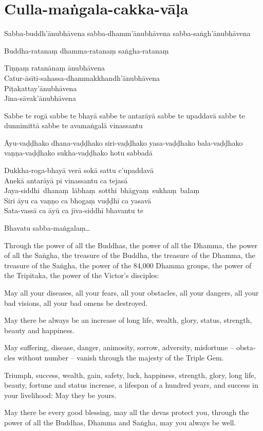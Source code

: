 \section{Culla-maṅgala-cakka-vāḷa}


Sabba-buddh'ānubhāvena sabba-dhamm'ānubhāvena sabba-saṅgh'ānubhāvena

Buddha-ratanaṃ dhamma-ratanaṃ saṅgha-ratanaṃ

Tiṇṇaṃ ratanānaṃ ānubhāvena\\
Catur-āsīti-sahassa-dhammakkhandh'ānubhāvena\\
Piṭakattay'ānubhāvena\\
Jina-sāvak'ānubhāvena

Sabbe te rogā sabbe te bhayā sabbe te antarāyā sabbe te upaddavā sabbe te
dunnimittā sabbe te avamaṅgalā vinassantu

Āyu-vaḍḍhako dhana-vaḍḍhako siri-vaḍḍhako yasa-vaḍḍhako bala-vaḍḍhako
vaṇṇa-vaḍḍhako sukha-vaḍḍhako hotu sabbadā

Dukkha-roga-bhayā verā sokā sattu c'upaddavā\\
Anekā antarāyā pi vinassantu ca tejasā\\
\mbox{Jaya-siddhi dhanaṃ lābhaṃ sotthi bhāgyaṃ sukhaṃ balaṃ}\\
Siri āyu ca vaṇṇo ca bhogaṃ vuḍḍhī ca yasavā\\
Sata-vassā ca āyū ca jīva-siddhī bhavantu te

Bhavatu sabba-maṅgalaṃ\ldots{}

\begin{english}
  Through the power of all the Buddhas, the power of all the Dhamma, the power of all the Saṅgha,
  the treasure of the Buddha, the treasure of the Dhamma, the treasure of the Saṅgha,
  the power of the 84,000 Dhamma groups, the power of the Tripitaka, the power
  of the Victor's disciples:

  May all your diseases, all your fears, all your obstacles,
  all your dangers, all your bad visions, all your bad omens be destroyed.

  May there be always be an increase of long life, wealth, glory, status,
  strength, beauty and happiness.

  May suffering, disease, danger, animosity, sorrow, adversity, misfortune --
  obstacles without number -- vanish through the majesty of the Triple Gem.

  Triumph, success, wealth, gain, safety, luck, happiness, strength, glory, long
  life, beauty, fortune and status increase, a lifespan of a hundred years, and
  success in your livelihood: May they be yours.

  May there be every good blessing, may all the devas protect you, through the
  power of all the Buddhas, Dhamma and Saṅgha, may you always be well.
\end{english}

